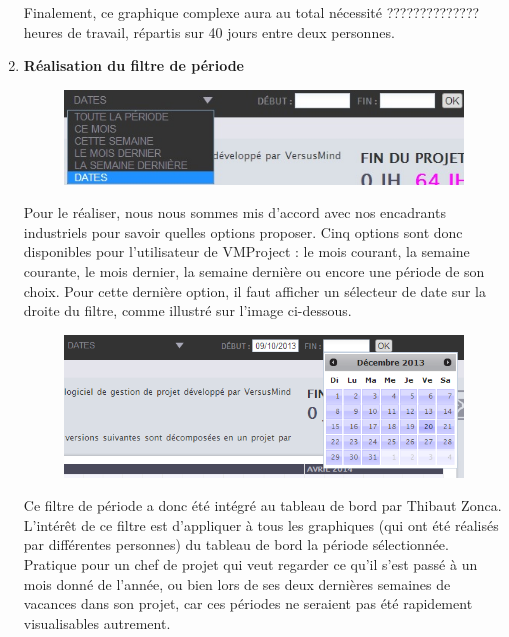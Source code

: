 \documentclass[12pt]{report}
\begin{document}
\begin{enumerate}
Finalement, ce graphique complexe aura au total nécessité ?????????????? heures de travail, répartis sur 40 jours entre deux personnes.\\




\item \textbf{Réalisation du filtre de période}

\begin{figure}[H]
	\centering
	\includegraphics[width=1\textwidth]{pictures/realisations/filtrePeriode.jpg}
	\caption{}
	\label{21}
\end{figure}

Pour le réaliser, nous nous sommes mis d'accord avec nos encadrants industriels pour savoir quelles options proposer. Cinq options sont donc disponibles pour l'utilisateur de VMProject : le mois courant, la semaine courante, le mois dernier, la semaine dernière ou encore une période de son choix. Pour cette dernière option, il faut afficher un sélecteur de date sur la droite du filtre, comme illustré sur l'image ci-dessous.\\

\begin{figure}[H]
	\centering
	\includegraphics[width=1\textwidth]{pictures/realisations/filtrePeriodeDatepicker.png}
	\caption{}
	\label{22}
\end{figure}

Ce filtre de période a donc été intégré au tableau de bord par Thibaut Zonca. L'intérêt de ce filtre est d'appliquer à tous les graphiques (qui ont été réalisés par différentes personnes) du tableau de bord la période sélectionnée. Pratique pour un chef de projet qui veut regarder ce qu'il s'est passé à un mois donné de l'année, ou bien lors de ses deux dernières semaines de vacances dans son projet, car ces périodes ne seraient pas été rapidement visualisables autrement.\\


\end{enumerate}
\end{document}
